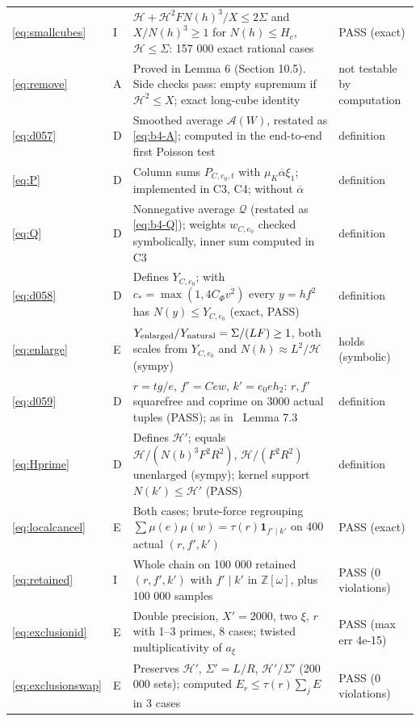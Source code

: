 \documentclass[11pt]{article}
\numberwithin{equation}{section}
\begin{document}
\begin{longtable}{@{}>{\raggedright\arraybackslash}p{1.2cm}>{\centering\arraybackslash}p{0.7cm}>{\raggedright\arraybackslash}p{9.05cm}>{\raggedright\arraybackslash}p{4.3cm}@{}}
\eqref{eq:smallcubes} & I & $\mathcal H+\mathcal H^2FN(h)^3/X\le2\Sigma$ and $X/N(h)^3\ge1$ for $N(h)\le H_c$, $\mathcal H\le\Sigma$: 157 000 exact rational cases & PASS (exact)\\
\eqref{eq:remove} & A & Proved in Lemma 6 (Section 10.5). Side checks pass: empty supremum if $\mathcal H^2\le X$; exact long-cube identity & not testable by computation\\
\eqref{eq:d057} & D & Smoothed average $\mathcal A(W)$, restated as \eqref{eq:b4-A}; computed in the end-to-end first Poisson test & definition\\
\eqref{eq:P} & D & Column sums $P_{C,e_0,t}$ with $\mu_K\overline{\alpha}\xi_1$; implemented in C3, C4; \cite[(7.1)]{OAI1112} without $\overline{\alpha}$ & definition\\
\eqref{eq:Q} & D & Nonnegative average $\mathcal Q$ (restated as \eqref{eq:b4-Q}); weights $w_{C,e_0}$ checked symbolically, inner sum computed in C3 & definition\\
\eqref{eq:d058} & D & Defines $Y_{C,e_0}$; with $c_*=\max(1,4C_\Phi v^2)$ every $y=hf^2$ has $N(y)\le Y_{C,e_0}$ (exact, PASS) & definition\\
\eqref{eq:enlarge} & E & $Y_{\rm enlarged}/Y_{\rm natural}=\Sigma/(LF)\ge1$, both scales from $Y_{C,e_0}$ and $N(h)\approx L^2/\mathcal H$ (sympy) & holds (symbolic)\\
\eqref{eq:d059} & D & $r=tg/e$, $f'=Cew$, $k'=e_0eh_2$: $r,f'$ squarefree and coprime on 3000 actual tuples (PASS); as in~\cite{OAI1112} Lemma 7.3 & definition\\
\eqref{eq:Hprime} & D & Defines $\mathcal H'$; equals $\mathcal H/(N(b)^3F^2R^2)$, $\mathcal H/(F^2R^2)$ unenlarged (sympy); kernel support $N(k')\le\mathcal H'$ (PASS) & definition\\
\eqref{eq:localcancel} & E & Both cases; brute-force regrouping $\sum\mu(e)\mu(w)=\tau(r)\mathbf 1_{f'\mid k'}$ on 400 actual $(r,f',k')$ & PASS (exact)\\
\eqref{eq:retained} & I & Whole chain on 100 000 retained $(r,f',k')$ with $f'\mid k'$ in $\mathbb Z[\omega]$, plus 100 000 samples & PASS (0 violations)\\
\eqref{eq:exclusionid} & E & Double precision, $X'=2000$, two $\xi$, $r$ with 1--3 primes, 8 cases; twisted multiplicativity of $a_\xi$ & PASS (max err 4e-15)\\
\eqref{eq:exclusionswap} & E & Preserves $\mathcal H'$, $\Sigma'=L/R$, $\mathcal H'/\Sigma'$ (200 000 sets); computed $E_r\le\tau(r)\sum_{j}E$ in 3 cases & PASS (0 violations)\\

\end{longtable}
\end{document}
